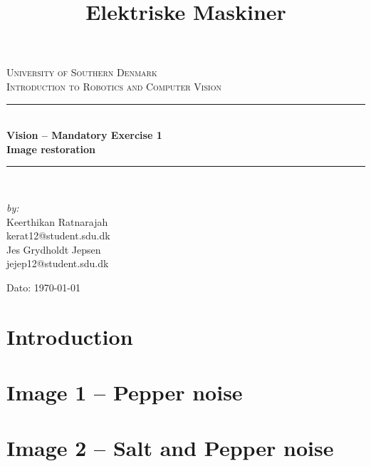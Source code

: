\documentclass[11pt]{article}
\title{Elektriske Maskiner}
\begin{document}
\begin{titlepage}
\begin{center}


\textsc{\LARGE University of Southern Denmark}\\[1.5cm]
\textsc{\Large Introduction to Robotics and Computer Vision}\\[0.5cm]
\vfill
\hrule ~\\[0.3cm]
{ \huge \bfseries Vision -- Mandatory Exercise 1\\ Image restoration\\[0.4cm] }
\hrule ~\\[1.5cm]
\vfill

\begin{minipage}[t]{7.9cm}
\begin{flushleft} \large
\emph{by:}\\
Keerthikan Ratnarajah  \\
kerat12@student.sdu.dk \\
Jes Grydholdt Jepsen   \\
jejep12@student.sdu.dk 
\end{flushleft}
\end{minipage}
\begin{minipage}[t]{7.9cm}
\begin{flushright} \large

\end{flushright}
\end{minipage}

\vspace{1.2cm}
Dato: \today


\end{center}
\end{titlepage}

\tableofcontents

\newpage
\section{Introduction}


\newpage
\section{Image 1 -- Pepper noise}


\newpage
\section{Image 2 -- Salt and Pepper noise}

\end{document}

